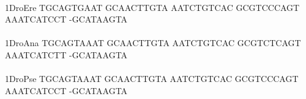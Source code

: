 \documentclass[11pt,twoside,reqno,a4paper]{article}
\begin{document}
{\hspace*{4\charwidth}\hspace*{7\charwidth}\hspace*{1\charwidth}\hspace*{1\charwidth}\hspace*{1\charwidth}\hspace*{1\charwidth}\hspace*{1\charwidth}\hspace*{1\charwidth}\\
1\hspace*{3\charwidth}DroEre	TGCAGTGAAT	GCAACTTGTA	AATCTGTCAC	GCGTCCCAGT	AAATCATCCT	-GCATAAGTA	\\
\hspace*{4\charwidth}\hspace*{7\charwidth}\hspace*{1\charwidth}\hspace*{1\charwidth}\hspace*{1\charwidth}\hspace*{1\charwidth}\hspace*{1\charwidth}\hspace*{1\charwidth}\\
1\hspace*{3\charwidth}DroAna	TGCAGTAAAT	GCAACTTGTA	AATCTGTCAC	GCGTCTCAGT	AAATCATCTT	-GCATAAGTA	\\
\hspace*{4\charwidth}\hspace*{7\charwidth}\hspace*{1\charwidth}\hspace*{1\charwidth}\hspace*{1\charwidth}\hspace*{1\charwidth}\hspace*{1\charwidth}\hspace*{1\charwidth}\\
1\hspace*{3\charwidth}DroPse	TGCAGTAAAT	GCAACTTGTA	AATCTGTCAC	GCGTCCCAGT	AAATCATCCT	-GCATAAGTA	\\
\hspace*{4\charwidth}\hspace*{7\charwidth}\hspace*{1\charwidth}\hspace*{1\charwidth}\hspace*{1\charwidth}\hspace*{1\charwidth}\hspace*{1\charwidth}\hspace*{1\charwidth}\\
}
\end{document}
